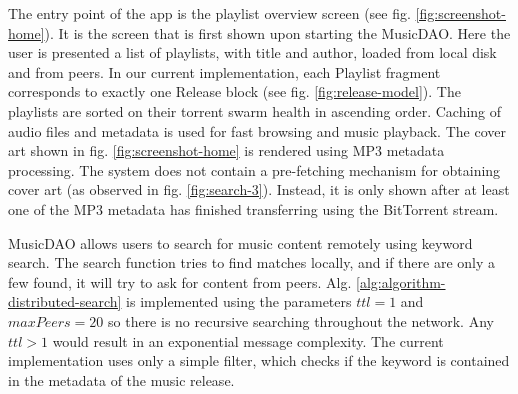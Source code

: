 The entry point of the app is the playlist overview screen (see fig. \ref{fig:screenshot-home}). It is the screen that is first shown upon starting the MusicDAO. Here the user is presented a list of playlists, with title and author, loaded from local disk and from peers. In our current implementation, each Playlist fragment corresponds to exactly one Release block (see fig. \ref{fig:release-model}). The playlists are sorted on their torrent swarm health in ascending order. Caching of audio files and metadata is used for fast browsing and music playback. The cover art shown in fig. \ref{fig:screenshot-home} is rendered using MP3 metadata processing. The system does not contain a pre-fetching mechanism for obtaining cover art (as observed in fig. \ref{fig:search-3}). Instead, it is only shown after at least one of the MP3 metadata has finished transferring using the BitTorrent stream.

\label{sec:searching-musiccommunity-impl}
MusicDAO allows users to search for music content remotely using keyword search. The search function tries to find matches locally, and if there are only a few found, it will try to ask for content from peers. Alg. \ref{alg:algorithm-distributed-search} is implemented using the parameters $ttl=1$ and $maxPeers=20$ so there is no recursive searching throughout the network. Any $ttl>1$ would result in an exponential message complexity. The current implementation uses only a simple filter, which checks if the keyword is contained in the metadata of the music release.

